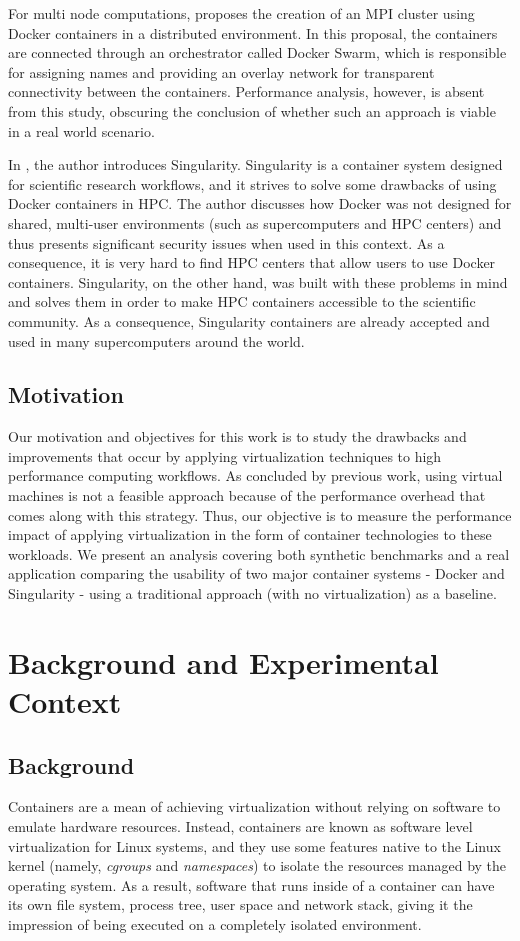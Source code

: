 \documentclass[12pt]{article}
\begin{document}
For multi node computations, \cite{7868429} proposes the creation of an MPI cluster using Docker containers in a distributed environment. In this proposal, the containers are connected through an orchestrator called Docker Swarm, which is responsible for assigning names and providing an overlay network  for transparent connectivity between the containers. Performance analysis, however, is absent from this study, obscuring the conclusion of whether such an approach is viable in a real world scenario.

In \cite{10.1371/journal.pone.0177459}, the author introduces Singularity. Singularity is a container system designed for scientific research workflows, and it strives to solve some drawbacks of using Docker containers in HPC. The author discusses how Docker was not designed for shared, multi-user environments (such as supercomputers and HPC centers) and thus presents significant security issues when used in this context. As a consequence, it is very hard to find HPC centers that allow users to use Docker containers. Singularity, on the other hand, was built with these problems in mind and solves them in order to make HPC containers accessible to the scientific community. As a consequence, Singularity containers are already accepted and used in many supercomputers around the world.

\subsection{Motivation}
Our motivation and objectives for this work is to study the drawbacks and improvements that occur by applying virtualization techniques to high performance computing workflows. As concluded by previous work, using virtual machines is not a feasible approach because of the performance overhead that comes along with this strategy. Thus, our objective is to measure the performance impact of applying virtualization in the form of container technologies to these workloads. We present an analysis covering both synthetic benchmarks and a real application comparing the usability of two major container systems - Docker and Singularity - using a traditional approach (with no virtualization) as a baseline. 

\section{Background and Experimental Context}
\subsection{Background}
Containers are a mean of achieving virtualization without relying on software to emulate hardware resources. Instead, containers are known as software level virtualization for Linux systems, and they use some features native to the Linux kernel (namely, \textit{cgroups} and \textit{namespaces}) to isolate the resources managed by the operating system. As a result, software that runs inside of a container can have its own file system, process tree, user space and network stack, giving it the impression of being executed on a completely isolated environment.
\end{document}
